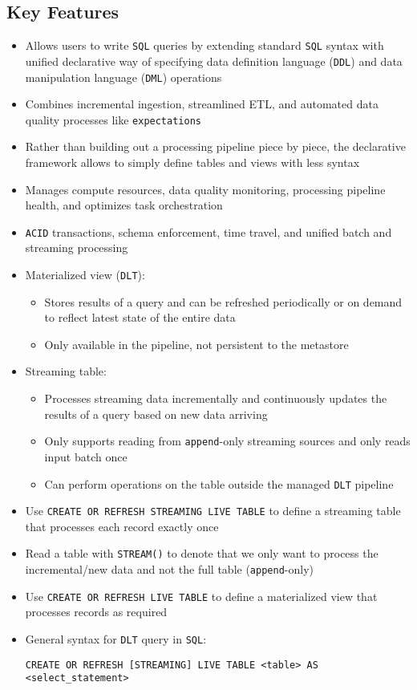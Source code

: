 \documentclass[11pt]{scrartcl}
\begin{document}
\subsection{Key Features} 
\begin{itemize}
	\item Allows users to write \texttt{SQL} queries by extending standard \texttt{SQL} syntax with unified declarative way of specifying data definition language (\texttt{DDL}) and data manipulation language (\texttt{DML}) operations
	\item Combines incremental ingestion, streamlined ETL, and automated data quality processes like \texttt{expectations} 
	\item Rather than building out a processing pipeline piece by piece, the declarative framework allows to simply define tables and views with less syntax
	\item Manages compute resources, data quality monitoring, processing pipeline health, and optimizes task orchestration
	\item \texttt{ACID} transactions, schema enforcement, time travel, and unified batch and streaming processing
	\item Materialized view (\texttt{DLT}): 
	\begin{itemize}
		\item Stores results of a query and can be refreshed periodically or on demand to reflect latest state of the entire data
		\item Only available in the pipeline, not persistent to the metastore
	\end{itemize}
	\item Streaming table:
	\begin{itemize}
		\item Processes streaming data incrementally and continuously updates the results of a query based on new data arriving
		\item Only supports reading from \texttt{append}-only streaming sources and only reads input batch once
		\item Can perform operations on the table outside the managed \texttt{DLT} pipeline
	\end{itemize}
	\item Use \texttt{CREATE OR REFRESH STREAMING LIVE TABLE} to define a streaming table that processes each record exactly once
	\item Read a table with \texttt{STREAM()} to denote that we only want to process the incremental/new data and not the full table (\texttt{append}-only)
	\item Use \texttt{CREATE OR REFRESH LIVE TABLE} to define a materialized view that processes records as required
	\item General syntax for \texttt{DLT} query in \texttt{SQL}:
\begin{lstlisting}
CREATE OR REFRESH [STREAMING] LIVE TABLE <table> AS
<select_statement>
\end{lstlisting}
\end{itemize}
\end{document}
